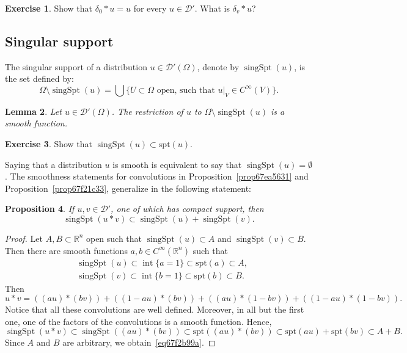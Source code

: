 \documentclass[a4paper,9pt]{amsart}
\newcommand{\scr}[1]{\mathscr{#1}}
\newcommand{\R}{\mathbb{R}}	%
\newcommand{\spt}{\mathrm{spt}}
\newcommand{\singspt}{\operatorname{singSpt}}
\newcommand{\interior}{\operatorname{int}}
\theoremstyle{plain}
\newtheorem{proposition}{Proposition}[section]
\newtheorem{lemma}[proposition]{Lemma}
\theoremstyle{definition}
\newtheorem{exercise}[proposition]{Exercise}%
\theoremstyle{remark}
\begin{document}
\begin{exercise}
	Show that $\delta_0*u = u$ for every $u\in\scr D'$.
	What is $\delta_v*u$?
\end{exercise}

\subsection{Singular support}
The singular support of a distribution $u\in\scr D'(\Omega)$, denote by $\singspt(u)$,
is the set defined by:
\begin{equation}
	\Omega\setminus \singspt(u) 
	= \bigcup \{U\subset\Omega\text{ open, such that }u|_V\in C^\infty(V)\} .
\end{equation}

\begin{lemma}
	Let $u\in\scr D'(\Omega)$.
	The restriction of $u$ to $\Omega\setminus\singspt(u)$ is a smooth function.
\end{lemma}

\begin{exercise}
	Show that $\singspt(u) \subset \spt(u)$.
\end{exercise}

Saying that a distribution $u$ is smooth is equivalent to say that $\singspt(u)=\emptyset$.
The smoothness statements for convolutions in Proposition~\ref{prop67ea5631} and Proposition~\ref{prop67f21c33}, generalize in the following statement:

\begin{proposition}\label{prop67f2a337}
	If $u,v\in\scr D'$, one of which has compact support, then
	\begin{equation}\label{eq67f2b99a}
		\singspt(u*v) \subset \singspt(u) + \singspt(v) .
	\end{equation}
\end{proposition}
\begin{proof}
	Let $A,B\subset\R^n$ open such that $\singspt(u)\subset A$ and $\singspt(v)\subset B$.
	Then there are smooth functions $a,b\in C^\infty(\R^n)$ such that 
	\begin{align*}
	 	&\singspt(u) \subset\interior\{a=1\} \subset\spt(a) \subset A ,\\
		&\singspt(v) \subset\interior\{b=1\} \subset\spt(b) \subset B .
	\end{align*}
	Then 
	\begin{equation}
		u*v
		= ((au)*(bv)) + ((1-au)*(bv)) + ((au)*(1-bv)) + ((1-au)*(1-bv)) .
	\end{equation}
	Notice that all these convolutions are well defined.
	Moreover, in all but the first one, one of the factors of the convolutions is a smooth function.
	Hence,
	\begin{equation}
		\singspt(u*v) 
		\subset \singspt((au)*(bv))
		\subset \spt((au)*(bv))
		\subset \spt(au) + \spt(bv) 
		\subset A + B .
	\end{equation}
	Since $A$ and $B$ are arbitrary, we obtain~\eqref{eq67f2b99a}.
\end{proof}
\end{document}
